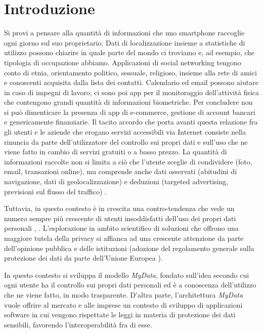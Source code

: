 \chapter{Introduzione}
\label{Introduzione}
\thispagestyle{empty}

\noindent Si provi a pensare alla quantit\`a di informazioni che uno smartphone raccoglie ogni giorno sul suo proprietario. Dati di localizzazione insieme a statistiche di utilizzo possono chiarire in quale parte del mondo ci troviamo e, ad esempio, che tipologia di occupazione abbiamo. Applicazioni di social networking tengono conto di etnia, orientamento politico, sessuale, religioso, insieme alla rete di amici e conoscenti acquisita dalla lista dei contatti. Calendario ed email possono aiutare in caso di impegni di lavoro; ci sono poi app per il monitoraggio dell’attivit\`a fisica che contengono grandi quantit\`a di informazioni biometriche. Per concludere non si pu\`o dimenticare la presenza di app di e-commerce, gestione di account bancari e genericamente finanziarie. Il tacito accordo che porta avanti questa relazione fra gli utenti e le aziende che erogano servizi accessibili via Internet consiste nella rinuncia da parte dell’utilizzatore del controllo sui propri dati e sull’uso che ne viene fatto in cambio di servizi gratuiti o a basso prezzo. La quantit\`a di informazioni raccolte non si limita a ci\`o che l’utente sceglie di condividere (foto, email, transazioni online), ma comprende anche dati osservati (abitudini di navigazione, dati di geolocalizzazione) e deduzioni (targeted advertising, previsioni sul flusso del traffico) \cite{IAFmDavis}.

Tuttavia, in questo contesto \`e in crescita una contro-tendenza che vede un numero sempre pi\`u crescente di utenti insoddisfatti dell’uso dei propri dati personali \cite{orangeDigitalTrust}, \cite{wefreport}. L’esplorazione in ambito scientifico di soluzioni che offrono una maggiore tutela della privacy si affianca ad una crescente attenzione da parte dell’opinione pubblica e delle istituzioni (adozione del regolamento generale sulla protezione dei dati da parte dell’Unione Europea \cite{gdpr}).

In questo contesto si sviluppa il modello \textit{MyData}, fondato sull’idea secondo cui ogni utente ha il controllo sui propri dati personali ed \`e a conoscenza dell’utilizzo che ne viene fatto, in modo trasparente. D’altra parte, l’architettura \textit{MyData} vuole offrire al mercato e alle imprese un contesto di sviluppo di applicazioni software in cui vengono rispettate le leggi in materia di protezione dei dati sensibili, favorendo l’interoperabilit\`a fra di esse.

